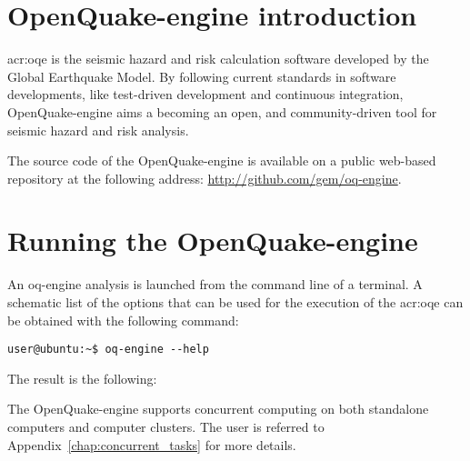 \section{OpenQuake-engine introduction}
\gls{acr:oqe} is the seismic hazard and risk calculation software developed 
by the Global Earthquake Model. By following current standards in software 
developments, like test-driven development and continuous
integration, OpenQuake-engine aims a becoming an open, and community-driven tool for
seismic hazard and risk analysis.

The source code of the OpenQuake-engine is available on a public web-based
repository at the following address: 
\href{http://github.com/gem/oq-engine}{http://github.com/gem/oq-engine}.
\section{Running the OpenQuake-engine}
\label{sec:intro}
An oq-engine analysis is launched from the command line of a terminal.
%
A schematic list of the options that can be used for the execution of the 
\gls{acr:oqe} can be obtained with the following command:
\begin{Verbatim}[frame=single, commandchars=\\\{\}, fontsize=\small]
user@ubuntu:~$ oq-engine --help
\end{Verbatim}
The result is the following:

The OpenQuake-engine supports concurrent computing on both standalone computers and computer clusters. The user is referred to Appendix~\ref{chap:concurrent_tasks} for more details.